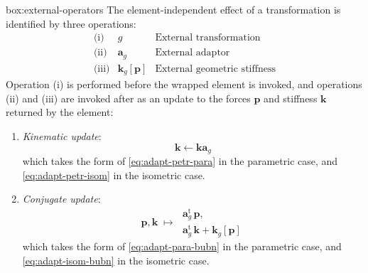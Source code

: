 \begin{ambox}{box:external-operators}
The element-independent effect of a transformation is identified by three operations:
\begin{equation*}
\begin{array}{lrl}
  \text{(i)}  & g                     & \text{External transformation} \\[2ex]
  \text{(ii)} & \mathbf{a}_g          & \text{External adaptor} \\[2ex]
  \text{(iii)}& \mathbf{k}_g\left[\bm{p}\right] 
                                      & \text{External geometric stiffness}%
\end{array}
\end{equation*}
%
Operation (i) is performed before the wrapped element is invoked,
and operations (ii) and (iii) are invoked after as an update to
the forces \(\bm{p}\) and stiffness \(\mathbf{k}\)
returned by the element:
\begin{enumerate}
\item \emph{Kinematic update}:
  \begin{equation*}
    \mathbf{k} \leftarrow {\mathbf{k}} \mathbf{a}_g
  \end{equation*}
  which takes the form of \eqref{eq:adapt-petr-para} in the parametric case, and \eqref{eq:adapt-petr-isom}
  in the isometric case.
\item \emph{Conjugate update}: 
  \begin{equation*}
    \bm{p}, \mathbf{k} \;\mapsto\;
    \begin{array}{l}
    \mathbf{a}_g^{\mathrm{t}} \, {\bm{p}}, \\
    \mathbf{a}_g^{\mathrm{t}} \, {\mathbf{k}}  + \mathbf{k}_g \left[\bm{p}\right]
    \end{array}
  \end{equation*}
  which takes the form of \eqref{eq:adapt-para-bubn} in the parametric case, and \eqref{eq:adapt-isom-bubn}
  in the isometric case.
\end{enumerate}
\end{ambox}

